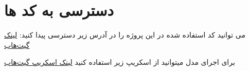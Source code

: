 
\section{دسترسی به کد ها}\label{ap:codes}
می توانید کد استفاده شده در این پروژه را در آدرس زیر دسترسی پیدا کنید:
\href{https://github.com/soheilsalimidev/lo-fAi}{لینک گیت‌هاب}

برای اجرای مدل میتوانید از اسکریپ زیر استفاده کنید
\href{https://github.com/soheilsalimidev/lo-fAi/blob/main/packages/inference/inferRWKV.py}{لینک اسکریپ گیت‌هاب}